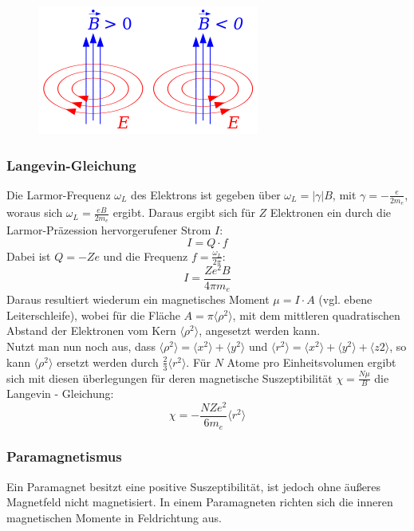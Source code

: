             \begin{figure}[H]
                \centering
                \includegraphics{Images/lenzRegel.png}
                \label{figLenz}
            \end{figure}
        \subsubsection*{Langevin-Gleichung}
        Die Larmor-Frequenz $\omega_L$ des Elektrons ist gegeben über $\omega_L = |\gamma | B$, mit $\gamma = -\frac{e}{2m_e}$, woraus sich $\omega_L = \frac{eB}{2m_e}$ ergibt. Daraus ergibt sich für $Z$ Elektronen ein durch die Larmor-Präzession hervorgerufener Strom $I$:
        \begin{equation}
        	I = Q \cdot f
        \end{equation}
        Dabei ist $Q = -Ze$ und die Frequenz $f = \frac{\omega_L}{2\pi}$:
        \begin{equation}
        	I = \frac{Ze^2 B}{4\pi m_e}
        \end{equation}
Daraus resultiert wiederum ein magnetisches Moment $\mu = I \cdot A$ (vgl. ebene Leiterschleife), wobei für die Fläche $A = \pi \langle \rho^2 \rangle$, mit dem mittleren quadratischen Abstand der Elektronen vom Kern $\langle \rho^2 \rangle$, angesetzt werden kann.\\
Nutzt man nun noch aus, dass $\langle \rho^2 \rangle = \langle x^2 \rangle + \langle y^2 \rangle$ und $\langle r^2 \rangle = \langle x^2 \rangle + \langle y^2 \rangle + \langle z2 \rangle$, so kann $\langle \rho^2 \rangle$ ersetzt werden durch $\frac{2}{3} \langle r^2 \rangle$. Für $N$ Atome pro Einheitsvolumen ergibt sich mit diesen überlegungen für deren magnetische Suszeptibilität $\chi = \frac{N\mu}{B}$ die Langevin - Gleichung:
	\begin{equation}
		\chi = - \frac{NZe^2}{6m_e} \langle r^2 \rangle
	\end{equation}
        \subsubsection*{Paramagnetismus}
            Ein Paramagnet besitzt eine positive Suszeptibilität, ist jedoch ohne äußeres
            Magnetfeld nicht magnetisiert. In einem Paramagneten richten sich die inneren magnetischen Momente
            in Feldrichtung aus.
